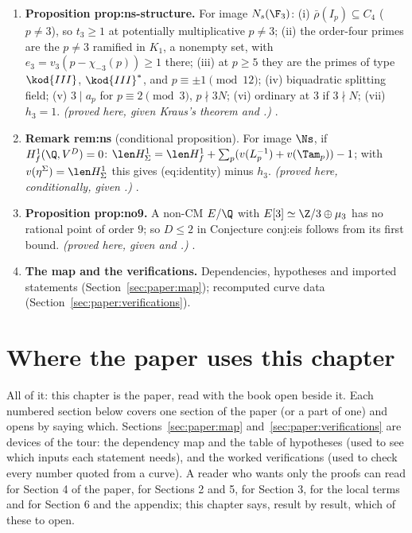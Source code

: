 \begin{sloppypar}
\begin{enumerate}[label=\textbf{\thechapter.\arabic*}]
\item \textbf{Proposition prop:ns-structure.} For image $N_s(\F_3)$: (i) $\bar\rho(I_p)\subseteq C_4$ ($p\ne3$), so $t_3\ge1$ at potentially multiplicative $p\ne3$; (ii) the order-four primes are the $p\ne3$ ramified in
$K_1$, a nonempty set, with $e_3=v_3(p-\chi_{-3}(p))\ge1$ there; (iii) at $p\ge5$ they are the primes of type $\kod{III}$, $\kod{III}^*$, and $p\equiv\pm1\pmod{12}$; (iv) biquadratic splitting field; (v)
$3\mid a_p$ for $p\equiv2\pmod3$, $p\nmid3N$; (vi) ordinary at $3$ if $3\nmid N$; (vii) $h_3=1$. \emph{(proved here, given Kraus's theorem and .)} .
\item \textbf{Remark rem:ns} (conditional proposition). For image $\Ns$, if $H^1_f(\Q,V^D)=0$: $\len H^1_\Sigma=\len H^1_f+\sum_p(v(L_p^{-1})+v(\Tam_p))-1$; with $v(\eta^\Sigma)=\len H^1_\Sigma$ this gives (eq:identity)
minus $h_3$. \emph{(proved here, conditionally, given .)} .
\item \textbf{Proposition prop:no9.} A non-CM $E/\Q$ with $E[3]\simeq\Z/3\oplus\mu_3$ has no rational point of order $9$; so $D\le2$ in Conjecture conj:eis follows from its first bound. \emph{(proved here,
given \cite{Ligozat75} and \cite{Mazur77}.)} .
\item \textbf{The map and the verifications.} Dependencies, hypotheses and imported statements (Section~\ref{sec:paper:map}); recomputed curve data (Section~\ref{sec:paper:verifications}).
\end{enumerate}

\section*{Where the paper uses this chapter}

All of it: this chapter is the paper, read with the book open beside it. Each numbered section below covers one section of the paper (or a part of
one) and opens by saying which. Sections~\ref{sec:paper:map} and~\ref{sec:paper:verifications} are devices of the tour: the dependency map and the table of
hypotheses (used to see which inputs each statement needs), and the worked verifications (used to check every number quoted from a curve). A reader who
wants only the proofs can read  for Section 4 of the paper,  for Sections 2 and 5,  for
Section 3,  for the local terms and  for Section 6 and the appendix; this chapter says, result by result,
which of these to open.


\end{sloppypar}
